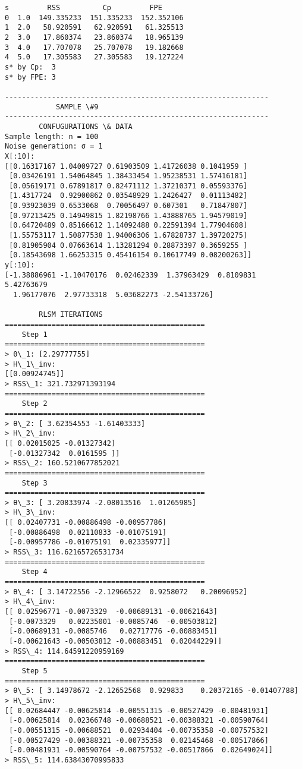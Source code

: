 \documentclass[11pt]{article}
\begin{document}
    \begin{Verbatim}[commandchars=\\\{\}]
     s         RSS          Cp         FPE
0  1.0  149.335233  151.335233  152.352106
1  2.0   58.920591   62.920591   61.325513
2  3.0   17.860374   23.860374   18.965139
3  4.0   17.707078   25.707078   19.182668
4  5.0   17.305583   27.305583   19.127224
s* by Cp:  3
s* by FPE: 3

--------------------------------------------------------------
			SAMPLE \#9
--------------------------------------------------------------
		CONFUGURATIONS \& DATA
Sample length: n = 100
Noise generation: σ = 1
X[:10]:
[[0.16317167 1.04009727 0.61903509 1.41726038 0.1041959 ]
 [0.03426191 1.54064845 1.38433454 1.95238531 1.57416181]
 [0.05619171 0.67891817 0.82471112 1.37210371 0.05593376]
 [1.4317724  0.92900862 0.03548929 1.2426427  0.01113482]
 [0.93923039 0.6533068  0.70056497 0.607301   0.71847807]
 [0.97213425 0.14949815 1.82198766 1.43888765 1.94579019]
 [0.64720489 0.85166612 1.14092488 0.22591394 1.77904608]
 [1.55753117 1.50877538 1.94006306 1.67828737 1.39720275]
 [0.81905904 0.07663614 1.13281294 0.28873397 0.3659255 ]
 [0.18543698 1.66253315 0.45416154 0.10617749 0.08200263]]
y[:10]:
[-1.38886961 -1.10470176  0.02462339  1.37963429  0.8109831   5.42763679
  1.96177076  2.97733318  5.03682273 -2.54133726]

		RLSM ITERATIONS
===============================================
	Step 1
===============================================
> θ\_1: [2.29777755]
> H\_1\_inv:
[[0.00924745]]
> RSS\_1: 321.732971393194
===============================================
	Step 2
===============================================
> θ\_2: [ 3.62354553 -1.61403333]
> H\_2\_inv:
[[ 0.02015025 -0.01327342]
 [-0.01327342  0.0161595 ]]
> RSS\_2: 160.5210677852021
===============================================
	Step 3
===============================================
> θ\_3: [ 3.20833974 -2.08013516  1.01265985]
> H\_3\_inv:
[[ 0.02407731 -0.00886498 -0.00957786]
 [-0.00886498  0.02110833 -0.01075191]
 [-0.00957786 -0.01075191  0.02335977]]
> RSS\_3: 116.62165726531734
===============================================
	Step 4
===============================================
> θ\_4: [ 3.14722556 -2.12966522  0.9258072   0.20096952]
> H\_4\_inv:
[[ 0.02596771 -0.0073329  -0.00689131 -0.00621643]
 [-0.0073329   0.02235001 -0.0085746  -0.00503812]
 [-0.00689131 -0.0085746   0.02717776 -0.00883451]
 [-0.00621643 -0.00503812 -0.00883451  0.02044229]]
> RSS\_4: 114.64591220959169
===============================================
	Step 5
===============================================
> θ\_5: [ 3.14978672 -2.12652568  0.929833    0.20372165 -0.01407788]
> H\_5\_inv:
[[ 0.02684447 -0.00625814 -0.00551315 -0.00527429 -0.00481931]
 [-0.00625814  0.02366748 -0.00688521 -0.00388321 -0.00590764]
 [-0.00551315 -0.00688521  0.02934404 -0.00735358 -0.00757532]
 [-0.00527429 -0.00388321 -0.00735358  0.02145468 -0.00517866]
 [-0.00481931 -0.00590764 -0.00757532 -0.00517866  0.02649024]]
> RSS\_5: 114.63843070995833


\end{Verbatim}
\end{document}
